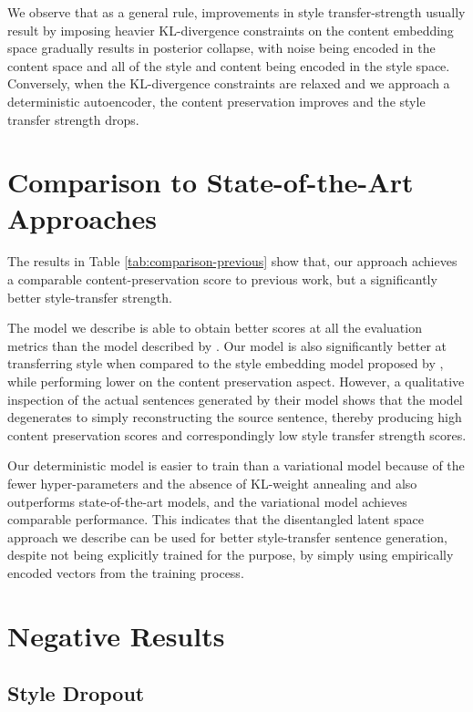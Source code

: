 We observe that as a general rule, improvements in style transfer-strength usually result by imposing heavier KL-divergence constraints on the content embedding space gradually results in posterior collapse, with noise being encoded in the content space and all of the style and content being encoded in the style space. Conversely, when the KL-divergence constraints are relaxed and we approach a deterministic autoencoder, the content preservation improves and the style transfer strength drops.


\section{Comparison to State-of-the-Art Approaches}

The results in Table \ref{tab:comparison-previous} show that, our approach achieves a comparable content-preservation score to previous work, but a significantly better style-transfer strength.

The model we describe is able to obtain better scores at all the evaluation metrics than the model described by \cite{shen2017style}. Our model is also significantly better at transferring style when compared to the style embedding model proposed by \cite{fu2017style}, while performing lower on the content preservation aspect. However, a qualitative inspection of the actual sentences generated by their model shows that the model degenerates to simply reconstructing the source sentence, thereby producing high content preservation scores and correspondingly low style transfer strength scores.

Our deterministic model is easier to train than a variational model because of the fewer hyper-parameters and the absence of KL-weight annealing  and also outperforms state-of-the-art models, and the variational model achieves comparable performance. This indicates that the disentangled latent space approach we describe can be used for better style-transfer sentence generation, despite not being explicitly trained for the purpose, by simply using empirically encoded vectors from the training process.


\section{Negative Results}

\subsection{Style Dropout}

